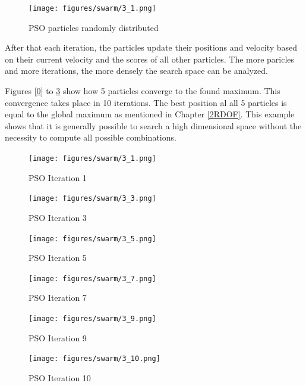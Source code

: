 \begin{figure}[H]
	\centerline{\texttt{[image: figures/swarm/3\_1.png]}}
	\caption{PSO particles randomly distributed}
	\label{PSO_1}
\end{figure}

After that each iteration, the particles update their positions and velocity based on their current velocity and the scores of all other particles.
The more paricles and more iterations, the more densely the search space can be analyzed. 

Figures \ref{0} to \ref{9} show how 5 particles converge to the found maximum. This convergence takes place in 10 iterations. The best position al all 5 particles is equal to the global maximum as mentioned in Chapter \ref{2RDOF}. This example shows that it is generally possible to search a high dimensional space without the necessity to compute all possible combinations.


\begin{figure}[H]
	\centering
	\begin{minipage}{0.5\textwidth}
		\texttt{[image: figures/swarm/3\_1.png]}
		\caption{PSO Iteration 1}
		\label{0}
	\end{minipage}\hfill
	\begin{minipage}{0.5\textwidth}
		\texttt{[image: figures/swarm/3\_3.png]}
		\caption{PSO Iteration 3}
		\label{2}
	\end{minipage}\par
\end{figure}	
\begin{figure}[H]	
		\centering
	\begin{minipage}{0.5\textwidth}
		\texttt{[image: figures/swarm/3\_5.png]}
		\caption{PSO Iteration 5}
		\label{4}
	\end{minipage}\hfill
	\begin{minipage}{0.5\textwidth}
		\texttt{[image: figures/swarm/3\_7.png]}
		\caption{PSO Iteration 7}
		\label{6}
	\end{minipage}\par
			\centering
	\begin{minipage}{0.5\textwidth}
		\texttt{[image: figures/swarm/3\_9.png]}
		\caption{PSO Iteration 9}
		\label{8}
	\end{minipage}\hfill
	\begin{minipage}{0.5\textwidth}
		\texttt{[image: figures/swarm/3\_10.png]}
		\caption{PSO Iteration 10}
		\label{9}
	\end{minipage}\par
\end{figure}

